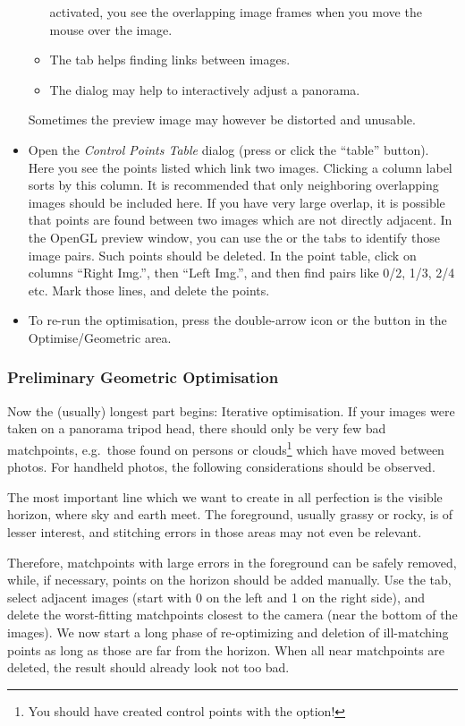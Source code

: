 \begin{itemize}
\begin{itemize}
    activated, you see the overlapping image frames when you move the
    mouse over the image.
  \item The  tab helps finding links between images.
  \item The  dialog may help to interactively adjust a
    panorama.
  \end{itemize}
  Sometimes the preview image may however be distorted and unusable. 
\item Open the \emph{Control Points Table} dialog (press  or click the ``table''
  button). Here you see the points listed which link two
  images. Clicking a column label sorts by this column. It is
  recommended that only neighboring overlapping images should be
  included here. If you have very large overlap, it is possible that
  points are found between two images which are not directly
  adjacent. In the OpenGL preview window, you can use the  or
  the  tabs to identify those image pairs. Such points should be
  deleted. In the point table, click on columns ``Right Img.'', then
  ``Left Img.'', and then find pairs like 0/2, 1/3, 2/4 etc. Mark
  those lines, and delete the points.
\item To re-run the optimisation, press the double-arrow icon or the
   button in the Optimise/Geometric area.
\end{itemize}


\subsubsection{Preliminary Geometric Optimisation}
\label{sec:landscapes:Optimisation}


Now the (usually) longest part begins: Iterative optimisation. If your
images were taken on a panorama tripod head, there should only be very
few bad matchpoints, e.g.\ those found on persons or
clouds\footnote{You should have created control points with the
   option!} which have moved between photos. For handheld
photos, the following considerations should be observed.

The most important line which we want to create in all perfection is the visible
horizon, where sky and earth meet. The foreground, usually grassy or
rocky, is of lesser interest, and stitching errors in those areas may
not even be relevant.

Therefore, matchpoints with large errors in the foreground can be
safely removed, while, if necessary, points on the horizon should be
added manually. Use the  tab, select adjacent
images (start with 0 on the left and 1 on the right side), and delete
the worst-fitting matchpoints closest to the camera (near the bottom
of the images). We now start a long phase of re-optimizing and
deletion of ill-matching points as long as those are far from the
horizon. When all near matchpoints are deleted, the result should
already look not too bad.

